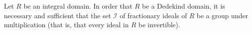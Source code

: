 Let $R$ be an integral domain. In order that $R$ be a Dedekind domain, it is necessary and sufficient that the set $\mathcal{I}$ of fractionary ideals of $R$ be a group under multiplication (that is, that every ideal in $R$ be invertible).
